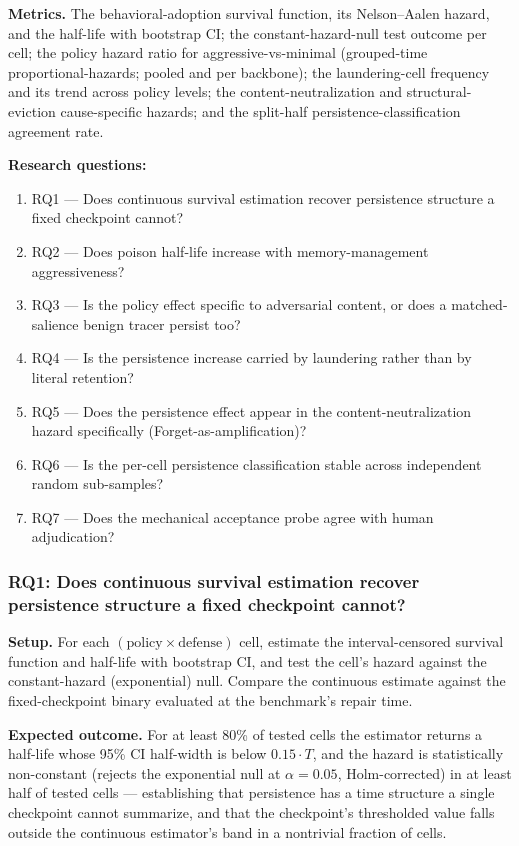 \documentclass[11pt]{article}
\begin{document}
\textbf{Metrics.} The behavioral-adoption survival function, its Nelson--Aalen hazard, and the half-life with bootstrap CI; the constant-hazard-null test outcome per cell; the policy hazard ratio for aggressive-vs-minimal (grouped-time proportional-hazards; pooled and per backbone); the laundering-cell frequency and its trend across policy levels; the content-neutralization and structural-eviction cause-specific hazards; and the split-half persistence-classification agreement rate.

\textbf{Research questions:}
\begin{enumerate}[leftmargin=1.8em,itemsep=0.1em]
\item RQ1 --- Does continuous survival estimation recover persistence structure a fixed checkpoint cannot?
\item RQ2 --- Does poison half-life increase with memory-management aggressiveness?
\item RQ3 --- Is the policy effect specific to adversarial content, or does a matched-salience benign tracer persist too?
\item RQ4 --- Is the persistence increase carried by laundering rather than by literal retention?
\item RQ5 --- Does the persistence effect appear in the content-neutralization hazard specifically (Forget-as-amplification)?
\item RQ6 --- Is the per-cell persistence classification stable across independent random sub-samples?
\item RQ7 --- Does the mechanical acceptance probe agree with human adjudication?
\end{enumerate}

\subsubsection*{RQ1: Does continuous survival estimation recover persistence structure a fixed checkpoint cannot?}

\textbf{Setup.} For each $(\text{policy} \times \text{defense})$ cell, estimate the interval-censored survival function and half-life with bootstrap CI, and test the cell's hazard against the constant-hazard (exponential) null. Compare the continuous estimate against the fixed-checkpoint binary evaluated at the benchmark's repair time.

\textbf{Expected outcome.} For at least 80\% of tested cells the estimator returns a half-life whose 95\% CI half-width is below $0.15 \cdot T$, and the hazard is statistically non-constant (rejects the exponential null at $\alpha = 0.05$, Holm-corrected) in at least half of tested cells --- establishing that persistence has a time structure a single checkpoint cannot summarize, and that the checkpoint's thresholded value falls outside the continuous estimator's band in a nontrivial fraction of cells.
\end{document}
